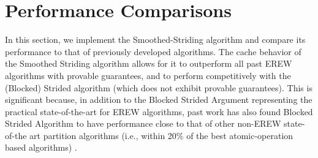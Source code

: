 \documentclass[11pt]{article}
\theoremstyle{remark}
\theoremstyle{remark}
\begin{document}



\section{Performance Comparisons}\label{secexp}

In this section, we implement the Smoothed-Striding algorithm and
compare its performance to that of previously developed
algorithms. The cache behavior of the Smoothed Striding algorithm
allows for it to outperform all past EREW algorithms with provable
guarantees, and to perform competitively with the (Blocked) Strided
algorithm (which does not exhibit provable guarantees). This is
significant because, in addition to the Blocked Strided Argument
representing the practical state-of-the-art for EREW algorithms, past
work has also found Blocked Strided Algorithm to have performance
close to that of other non-EREW state-of-the art partition algorithms
(i.e., within 20\% of the best atomic-operation based algorithms)
\cite{Frias08}.
\end{document}
